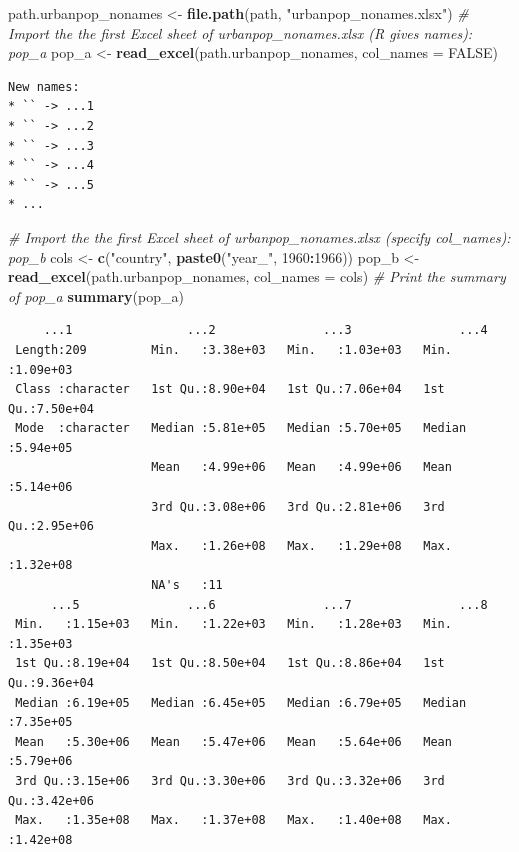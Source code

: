 \documentclass[
]{book}
\newenvironment{Shaded}{\begin{snugshade}}{\end{snugshade}}
\newcommand{\CommentTok}[1]{\textcolor[rgb]{0.56,0.35,0.01}{\textit{#1}}}
\newcommand{\DataTypeTok}[1]{\textcolor[rgb]{0.13,0.29,0.53}{#1}}
\newcommand{\DecValTok}[1]{\textcolor[rgb]{0.00,0.00,0.81}{#1}}
\newcommand{\KeywordTok}[1]{\textcolor[rgb]{0.13,0.29,0.53}{\textbf{#1}}}
\newcommand{\NormalTok}[1]{#1}
\newcommand{\OperatorTok}[1]{\textcolor[rgb]{0.81,0.36,0.00}{\textbf{#1}}}
\newcommand{\OtherTok}[1]{\textcolor[rgb]{0.56,0.35,0.01}{#1}}
\newcommand{\StringTok}[1]{\textcolor[rgb]{0.31,0.60,0.02}{#1}}
\begin{document}
\begin{Shaded}
\begin{Highlighting}[]
\NormalTok{path.urbanpop_nonames <-}\StringTok{ }\KeywordTok{file.path}\NormalTok{(path, }\StringTok{"urbanpop_nonames.xlsx"}\NormalTok{)}
\CommentTok{# Import the the first Excel sheet of urbanpop_nonames.xlsx (R gives names): pop_a}
\NormalTok{pop_a <-}\StringTok{ }\KeywordTok{read_excel}\NormalTok{(path.urbanpop_nonames, }\DataTypeTok{col_names =} \OtherTok{FALSE}\NormalTok{)}
\end{Highlighting}
\end{Shaded}

\begin{verbatim}
New names:
* `` -> ...1
* `` -> ...2
* `` -> ...3
* `` -> ...4
* `` -> ...5
* ...
\end{verbatim}

\begin{Shaded}
\begin{Highlighting}[]
\CommentTok{# Import the the first Excel sheet of urbanpop_nonames.xlsx (specify col_names): pop_b}
\NormalTok{cols <-}\StringTok{ }\KeywordTok{c}\NormalTok{(}\StringTok{"country"}\NormalTok{, }\KeywordTok{paste0}\NormalTok{(}\StringTok{"year_"}\NormalTok{, }\DecValTok{1960}\OperatorTok{:}\DecValTok{1966}\NormalTok{))}
\NormalTok{pop_b <-}\StringTok{ }\KeywordTok{read_excel}\NormalTok{(path.urbanpop_nonames, }\DataTypeTok{col_names =}\NormalTok{ cols)}
\CommentTok{# Print the summary of pop_a}
\KeywordTok{summary}\NormalTok{(pop_a)}
\end{Highlighting}
\end{Shaded}

\begin{verbatim}
     ...1                ...2               ...3               ...4         
 Length:209         Min.   :3.38e+03   Min.   :1.03e+03   Min.   :1.09e+03  
 Class :character   1st Qu.:8.90e+04   1st Qu.:7.06e+04   1st Qu.:7.50e+04  
 Mode  :character   Median :5.81e+05   Median :5.70e+05   Median :5.94e+05  
                    Mean   :4.99e+06   Mean   :4.99e+06   Mean   :5.14e+06  
                    3rd Qu.:3.08e+06   3rd Qu.:2.81e+06   3rd Qu.:2.95e+06  
                    Max.   :1.26e+08   Max.   :1.29e+08   Max.   :1.32e+08  
                    NA's   :11                                              
      ...5               ...6               ...7               ...8         
 Min.   :1.15e+03   Min.   :1.22e+03   Min.   :1.28e+03   Min.   :1.35e+03  
 1st Qu.:8.19e+04   1st Qu.:8.50e+04   1st Qu.:8.86e+04   1st Qu.:9.36e+04  
 Median :6.19e+05   Median :6.45e+05   Median :6.79e+05   Median :7.35e+05  
 Mean   :5.30e+06   Mean   :5.47e+06   Mean   :5.64e+06   Mean   :5.79e+06  
 3rd Qu.:3.15e+06   3rd Qu.:3.30e+06   3rd Qu.:3.32e+06   3rd Qu.:3.42e+06  
 Max.   :1.35e+08   Max.   :1.37e+08   Max.   :1.40e+08   Max.   :1.42e+08  
                                                                            
\end{verbatim}
\end{document}
